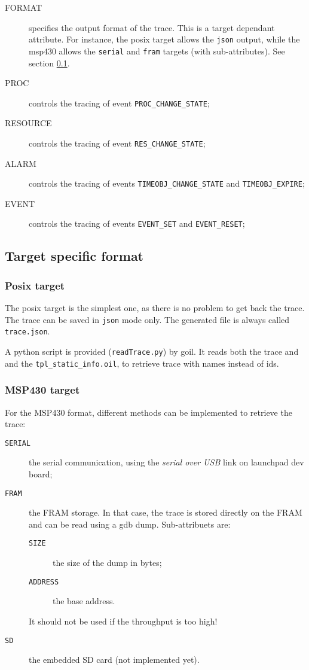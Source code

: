 \begin{description}
	\item[FORMAT] specifies the output format of the trace. This is a target dependant attribute. For instance, the posix target allows the \texttt{json} output, while the msp430 allows the \texttt{serial} and \texttt{fram} targets (with sub-attributes). See section \ref{sec:traceTargetFormat}.

  \item[PROC] controls the tracing of event \texttt{PROC\_CHANGE\_STATE};

  \item[RESOURCE] controls the tracing of event \texttt{RES\_CHANGE\_STATE};

  \item[ALARM] controls the tracing of events \texttt{TIMEOBJ\_CHANGE\_STATE}
    and \texttt{TIMEOBJ\_EXPIRE};

  \item[EVENT]  controls the tracing of events \texttt{EVENT\_SET}
    and \texttt{EVENT\_RESET};
\end{description}

\subsection{Target specific format}
\label{sec:traceTargetFormat}
\subsubsection{Posix target}
The posix target is the simplest one, as there is no problem to get back the trace. The trace can be saved in \texttt{json} mode only. The generated file is always called \texttt{trace.json}.

A python script is provided (\texttt{readTrace.py}) by goil. It reads both the trace and and the \texttt{tpl_static_info.oil}, to retrieve trace with names instead of ids.

\subsubsection{MSP430 target}
For the MSP430 format, different methods can be implemented to retrieve the trace:
\begin{description}
	\item[\texttt{SERIAL}] the serial communication, using the \emph{serial over USB} link on launchpad dev board;
	\item[\texttt{FRAM}] the FRAM storage. In that case, the trace is stored directly on the FRAM and can be read using a gdb dump. Sub-attribuets are:
\begin{description}
	\item[\texttt{SIZE}] the size of the dump in bytes;
	\item[\texttt{ADDRESS}] the base address.
\end{description} It should not be used if the throughput is too high!
	\item[\texttt{SD}] the embedded SD card (not implemented yet).
\end{description}

